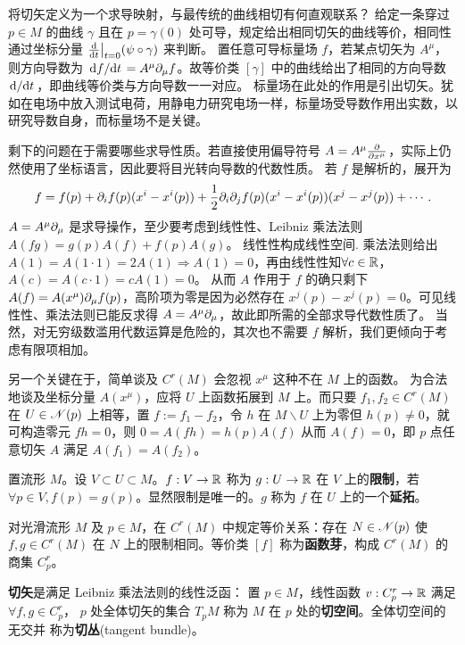 将切矢定义为一个求导映射，与最传统的曲线相切有何直观联系？
给定一条穿过 $p\in M$ 的曲线 $\gamma$ 且在 $p=\gamma(0)$ 处可导，规定给出相同切矢的曲线等价，相同性通过坐标分量 $\dv{t}\big|_{t=0}(\psi\circ\gamma)$ 来判断。
置任意可导标量场 $f$，若某点切矢为 $A^\mu$，则方向导数为 $\dv*{f}{t}=A^\mu\partial_\mu f$。故等价类 $[\gamma]$ 中的曲线给出了相同的方向导数 $\dv*{t}$，即曲线等价类与方向导数一一对应。
标量场在此处的作用是引出切矢。犹如在电场中放入测试电荷，用静电力研究电场一样，标量场受导数作用出实数，以研究导数自身，而标量场不是关键。

剩下的问题在于需要哪些求导性质。若直接使用偏导符号 $A=A^\mu\pdv{x^\mu}$，实际上仍然使用了坐标语言，因此要将目光转向导数的代数性质。
若 $f$ 是解析的，展开为
\[
    f=f(p)+\partial_i f(p)(x^i-x^i(p))+ \frac 12\partial_i\partial_j f(p)(x^i-x^i(p))(x^j-x^j(p))+\cdots.
\]
$A=A^\mu\partial_\mu$ 是求导操作，至少要考虑到线性性、Leibniz 乘法法则 $A(fg)=g(p)A(f)+f(p)A(g)$。
线性性构成线性空间.
乘法法则给出 $A(1)=A(1\cdot 1)=2A(1)\Rightarrow A(1)=0$，再由线性性知$\forall c\in\mathbb{R}$，$A(c)=A(c\cdot 1)=c A(1)=0$。
从而 $A$ 作用于 $f$ 的确只剩下 $A(f)=A(x^\mu)\partial_\mu f(p)$，高阶项为零是因为必然存在 $x^j(p)-x^j(p)=0$。可见线性性、乘法法则已能反求得 $A=A^\mu\partial_\mu$，故此即所需的全部求导代数性质了。
当然，对无穷级数滥用代数运算是危险的，其次也不需要 $f$ 解析，我们更倾向于考虑有限项相加。

另一个关键在于，简单谈及 $C^r(M)$ 会忽视 $x^\mu$ 这种不在 $M$ 上的函数。
为合法地谈及坐标分量 $A(x^\mu)$，应将 $U$ 上函数拓展到 $M$ 上。而只要 $f_1,f_2\in C^r(M)$ 在 $U\in\mathscr N(p)$ 上相等，置 $f:=f_1-f_2$，令 $h$ 在 $M\backslash U$ 上为零但 $h(p)\ne 0$，就可构造零元 $fh=0$，则 $0=A(fh)=h(p)A(f)$ 从而 $A(f)=0$，即 $p$ 点任意切矢 $A$ 满足 $A(f_1)=A(f_2)$。

\begin{definition}
    置流形 $M$。设 $V\subset U\subset M$。$f:V\to\mathbb{R}$ 称为 $g:U\to\mathbb{R}$ 在 $V$ 上的\textbf{限制}，若 $\forall p\in V,f(p)=g(p)$。显然限制是唯一的。$g$ 称为 $f$ 在 $U$ 上的一个\textbf{延拓}。

    
\end{definition}

对光滑流形 $M$ 及 $p\in M$，在 $C^r(M)$ 中规定等价关系：存在 $N\in\mathscr N(p)$ 使 $f,g\in C^r(M)$ 在 $N$ 上的限制相同。等价类 $[f]$ 称为\textbf{函数芽}，构成 $C^r(M)$ 的商集 $C^r_p$。
\begin{definition}
    \textbf{切矢}是满足 Leibniz 乘法法则的线性泛函：
    置 $p\in M$，线性函数 $v:C^r_p\to\mathbb{R}$ 满足 $\forall f,g\in C^r_p$，
    $p$ 处全体切矢的集合 $T_p M$ 称为 $M$ 在 $p$ 处的\textbf{切空间}。全体切空间的无交并
    称为\textbf{切丛}(tangent bundle)。
\end{definition}

